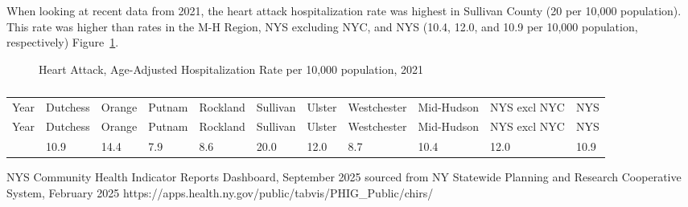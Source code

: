 \documentclass[
  english,
  letterpaper,
]{report}
\begin{document}
When looking at recent data from 2021, the heart attack hospitalization
rate was highest in Sullivan County (20 per 10,000 population). This
rate was higher than rates in the M-H Region, NYS excluding NYC, and NYS
(10.4, 12.0, and 10.9 per 10,000 population, respectively)
Figure~\ref{fig-heartattack-hospital-aar}.

\begin{figure}


\caption{\label{fig-heartattack-hospital-aar}Heart Attack, Age-Adjusted
Hospitalization Rate per 10,000 population, 2021}

\end{figure}%

\begin{longtable}[]{@{}lllllllllll@{}}

\caption{\label{tbl-heartattack-hospital-aar}Heart Attack, Age-Adjusted
Hospitalization Rate per 10,000 population, 2021}

\tabularnewline

\caption{}\label{T_e7bb0}\tabularnewline
\toprule\noalign{}
Year & Dutchess & Orange & Putnam & Rockland & Sullivan & Ulster &
Westchester & Mid-Hudson & NYS excl NYC & NYS \\
\midrule\noalign{}
\endfirsthead
\toprule\noalign{}
Year & Dutchess & Orange & Putnam & Rockland & Sullivan & Ulster &
Westchester & Mid-Hudson & NYS excl NYC & NYS \\
\midrule\noalign{}
\endhead
\bottomrule\noalign{}
\endlastfoot
2021 & 10.9 & 14.4 & 7.9 & 8.6 & 20.0 & 12.0 & 8.7 & 10.4 & 12.0 &
10.9 \\

\end{longtable}

\begin{tcolorbox}[enhanced jigsaw, breakable, leftrule=.75mm, title=\textcolor{quarto-callout-note-color}{\faInfo}\hspace{0.5em}{Source}, bottomrule=.15mm, opacityback=0, left=2mm, colback=white, bottomtitle=1mm, coltitle=black, colbacktitle=quarto-callout-note-color!10!white, colframe=quarto-callout-note-color-frame, opacitybacktitle=0.6, toptitle=1mm, titlerule=0mm, arc=.35mm, rightrule=.15mm, toprule=.15mm]

NYS Community Health Indicator Reports Dashboard, September 2025 sourced
from NY Statewide Planning and Research Cooperative System, February
2025 https://apps.health.ny.gov/public/tabvis/PHIG\_Public/chirs/

\end{tcolorbox}
\end{document}
